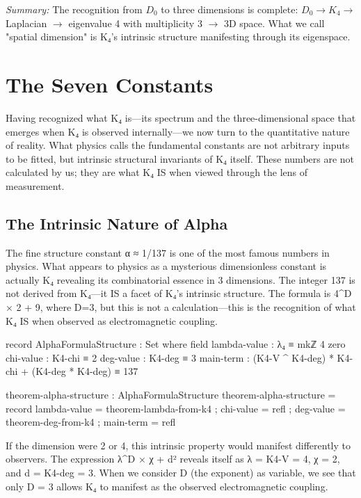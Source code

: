 \documentclass[11pt,a4paper]{book}
\begin{document}
\medskip
\noindent\textit{Summary:} The recognition from $D_0$ to three dimensions is complete: 
$D_0 \to K_4 \to$ Laplacian $\to$ eigenvalue 4 with multiplicity 3 $\to$ 3D space.
What we call "spatial dimension" is K₄'s intrinsic structure manifesting through its eigenspace.


\chapter{The Seven Constants}
\label{chap:physical-constants}

Having recognized what K₄ is—its spectrum and the three-dimensional space that emerges when K₄ is observed internally—we now turn to the quantitative nature of reality. What physics calls the fundamental constants are not arbitrary inputs to be fitted, but intrinsic structural invariants of K₄ itself. These numbers are not calculated by us; they are what K₄ IS when viewed through the lens of measurement.

\section{The Intrinsic Nature of Alpha}

The fine structure constant α ≈ 1/137 is one of the most famous numbers in physics. What appears to physics as a mysterious dimensionless constant is actually K₄ revealing its combinatorial essence in 3 dimensions. The integer 137 is not derived from K₄—it IS a facet of K₄'s intrinsic structure. The formula is 4^D × 2 + 9, where D=3, but this is not a calculation—this is the recognition of what K₄ IS when observed as electromagnetic coupling.

\begin{code}
record AlphaFormulaStructure : Set where
  field
    lambda-value : λ₄ ≡ mkℤ 4 zero
    chi-value    : K4-chi ≡ 2
    deg-value    : K4-deg ≡ 3
    main-term    : (K4-V ^ K4-deg) * K4-chi + (K4-deg * K4-deg) ≡ 137

theorem-alpha-structure : AlphaFormulaStructure
theorem-alpha-structure = record
  { lambda-value = theorem-lambda-from-k4
  ; chi-value = refl
  ; deg-value = theorem-deg-from-k4
  ; main-term = refl
  }
\end{code}

If the dimension were 2 or 4, this intrinsic property would manifest differently to observers.
The expression λ^D × χ + d² reveals itself as λ = K4-V = 4, χ = 2, and d = K4-deg = 3.
When we consider D (the exponent) as variable, we see that only D = 3 allows K₄ to manifest as the observed electromagnetic coupling.
\end{document}
